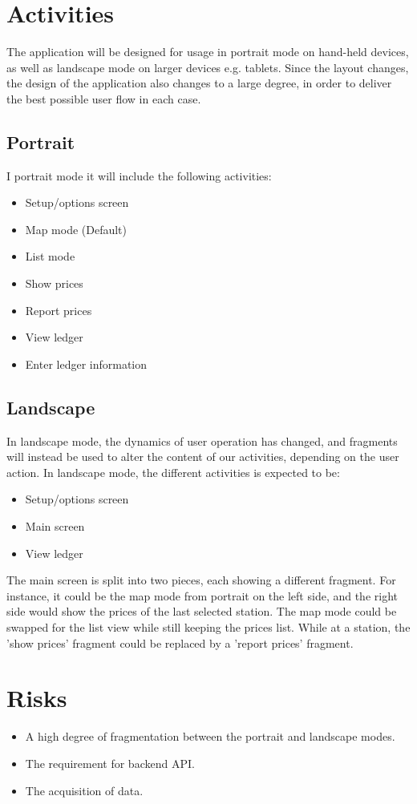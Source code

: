\section{Activities}
The application will be designed for usage in portrait mode on hand-held devices, as well as landscape mode on larger devices e.g. tablets. Since the layout changes, the design of the application also changes to a large degree, in order to deliver the best possible user flow in each case.

\subsection{Portrait}
I portrait mode it will include the following activities:
\begin{itemize}
	\item Setup/options screen
	\item Map mode (Default)
	\item List mode
	\item Show prices
	\item Report prices
	\item View ledger
	\item Enter ledger information
\end{itemize}

\subsection{Landscape}
In landscape mode, the dynamics of user operation has changed, and fragments will instead be used to alter the content of our activities, depending on the user action. In landscape mode, the different activities is expected to be:
\begin{itemize}
	\item Setup/options screen
	\item Main screen
	\item View ledger
\end{itemize}

The main screen is split into two pieces, each showing a different fragment. For instance, it could be the map mode from portrait on the left side, and the right side would show the prices of the last selected station. The map mode could be swapped for the list view while still keeping the prices list. While at a station, the 'show prices' fragment could be replaced by a 'report prices' fragment.

\section{Risks}
\begin{itemize}
	\item A high degree of fragmentation between the portrait and landscape modes.
	\item The requirement for backend API.
	\item The acquisition of data.
\end{itemize}


